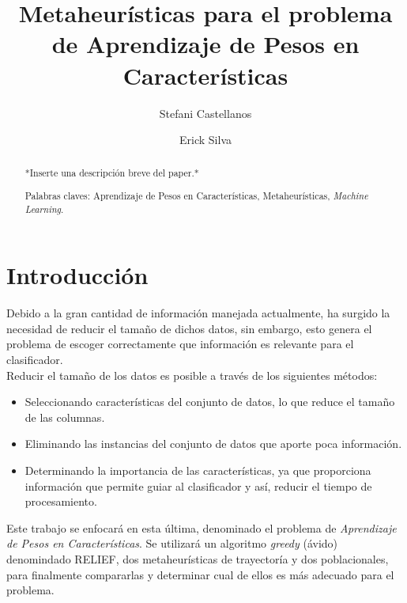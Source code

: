 \documentclass{ci5652}
\title{Metaheurísticas para el problema de Aprendizaje de Pesos en Características}
\author{Stefani Castellanos
        \and
        Erick Silva}
\begin{document}
\thispagestyle{empty}
\maketitle


\begin{abstract}
*Inserte una descripción breve del paper.*

Palabras claves: Aprendizaje de Pesos en Características, Metaheurísticas,
\textit{Machine Learning}.
\end{abstract}


\section*{Introducción}
Debido a la gran cantidad de información manejada actualmente, ha surgido la
necesidad de reducir el tamaño de dichos datos, sin embargo, esto genera el
problema de escoger correctamente que información es relevante para el
clasificador.\cite{Cano_2003} \\

Reducir el tamaño de los datos es posible a través de los siguientes métodos:

\begin{itemize}
  \item Seleccionando características del conjunto de datos, lo que reduce el
  tamaño de las columnas.
  \item Eliminando las instancias del conjunto de datos que aporte poca
  información.
  \item Determinando la importancia de las características, ya que proporciona
  información que permite guiar al clasificador y así, reducir el tiempo de
  procesamiento.
\end{itemize}

Este trabajo se enfocará en esta última, denominado el problema de \textit{Aprendizaje
de Pesos en Características}. Se utilizará un algoritmo \textit{greedy} (ávido)
denomindado RELIEF, dos metaheurísticas de trayectoría y dos poblacionales,
para finalmente compararlas y determinar cual de ellos es más adecuado para el
problema.
\end{document}
